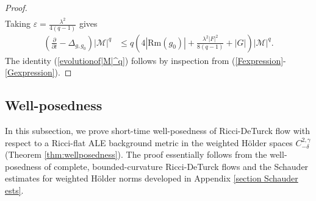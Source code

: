 \documentclass[12pt]{amsart}
\newcommand{\calM}{\mathcal{M}}
\newcommand{\p}{{ \partial}}
\renewcommand{\1}{{\mathbf 1}}
\newcommand{\Rm}{\mathrm{Rm}}
\renewcommand{\p}{{\partial}}
\newcommand{\eps}{{\varepsilon}}
\theoremstyle{others}
\numberwithin{equation}{section}
\begin{document}
\begin{proof}
\begin{equation}
\begin{split}
       \end{split}
   \end{equation}
   Taking $\eps = \frac{\lambda^2}{4(q-1)}$ gives
            \begin{equation}
       \begin{split}
           \left( \frac{\p}{\p t} - \Delta_{g, g_0} \right) |\calM|^q 
           & \leq q \left( 4 |\Rm (g_0)| + \frac{\lambda^2 |F|^2}{8 (q-1)} + |G| \right) |\calM|^q.
       \end{split}
   \end{equation}
   The identity (\ref{evolutionof|M|^q}) follows by inspection from (\ref{Fexpression}-\ref{Gexpression}).
\end{proof}


\vspace{2mm}




\vspace{2mm}


\subsection{Well-posedness}

In this subsection, we prove short-time well-posedness of Ricci-DeTurck flow with respect to a Ricci-flat ALE background metric in the weighted H{\"o}lder spaces $C^{2, \gamma}_{-\delta}$ (Theorem \ref{thm:wellposedness}).
The proof essentially follows from the well-posedness of complete, bounded-curvature Ricci-DeTurck flows \cite{Shi89, ChenZhu06} and the Schauder estimates for weighted H{\"o}lder norms developed in Appendix \ref{section Schauder ests}. 
\end{document}
